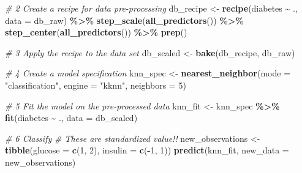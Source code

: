 \documentclass[
]{book}
\newenvironment{Shaded}{\begin{snugshade}}{\end{snugshade}}
\newcommand{\AttributeTok}[1]{\textcolor[rgb]{0.13,0.29,0.53}{#1}}
\newcommand{\CommentTok}[1]{\textcolor[rgb]{0.56,0.35,0.01}{\textit{#1}}}
\newcommand{\DecValTok}[1]{\textcolor[rgb]{0.00,0.00,0.81}{#1}}
\newcommand{\FunctionTok}[1]{\textcolor[rgb]{0.13,0.29,0.53}{\textbf{#1}}}
\newcommand{\NormalTok}[1]{#1}
\newcommand{\OtherTok}[1]{\textcolor[rgb]{0.56,0.35,0.01}{#1}}
\newcommand{\SpecialCharTok}[1]{\textcolor[rgb]{0.81,0.36,0.00}{\textbf{#1}}}
\newcommand{\StringTok}[1]{\textcolor[rgb]{0.31,0.60,0.02}{#1}}
\begin{document}
\begin{Shaded}
\begin{Highlighting}[]
\CommentTok{\# 2 Create a recipe for data pre{-}processing}
\NormalTok{db\_recipe }\OtherTok{\textless{}{-}} \FunctionTok{recipe}\NormalTok{(diabetes }\SpecialCharTok{\textasciitilde{}}\NormalTok{ ., }\AttributeTok{data =}\NormalTok{ db\_raw) }\SpecialCharTok{\%\textgreater{}\%}
  \FunctionTok{step\_scale}\NormalTok{(}\FunctionTok{all\_predictors}\NormalTok{()) }\SpecialCharTok{\%\textgreater{}\%}
  \FunctionTok{step\_center}\NormalTok{(}\FunctionTok{all\_predictors}\NormalTok{()) }\SpecialCharTok{\%\textgreater{}\%}
  \FunctionTok{prep}\NormalTok{()}
\end{Highlighting}
\end{Shaded}

\begin{Shaded}
\begin{Highlighting}[]
\CommentTok{\# 3 Apply the recipe to the data set}
\NormalTok{db\_scaled }\OtherTok{\textless{}{-}}  \FunctionTok{bake}\NormalTok{(db\_recipe, db\_raw)}
\end{Highlighting}
\end{Shaded}

\begin{Shaded}
\begin{Highlighting}[]
\CommentTok{\# 4 Create a model specification}
\NormalTok{knn\_spec }\OtherTok{\textless{}{-}} \FunctionTok{nearest\_neighbor}\NormalTok{(}\AttributeTok{mode =} \StringTok{"classification"}\NormalTok{,}
                             \AttributeTok{engine =} \StringTok{"kknn"}\NormalTok{,}
                             \AttributeTok{neighbors =} \DecValTok{5}\NormalTok{)}
\end{Highlighting}
\end{Shaded}

\begin{Shaded}
\begin{Highlighting}[]
\CommentTok{\# 5 Fit the model on the pre{-}processed data}
\NormalTok{knn\_fit }\OtherTok{\textless{}{-}}\NormalTok{ knn\_spec }\SpecialCharTok{\%\textgreater{}\%}
 \FunctionTok{fit}\NormalTok{(diabetes }\SpecialCharTok{\textasciitilde{}}\NormalTok{ ., }\AttributeTok{data =}\NormalTok{ db\_scaled)}
\end{Highlighting}
\end{Shaded}

\begin{Shaded}
\begin{Highlighting}[]
\CommentTok{\# 6 Classify}
\CommentTok{\# These are standardized value!!}
\NormalTok{new\_observations }\OtherTok{\textless{}{-}} \FunctionTok{tibble}\NormalTok{(}\AttributeTok{glucose =} \FunctionTok{c}\NormalTok{(}\DecValTok{1}\NormalTok{, }\DecValTok{2}\NormalTok{), }\AttributeTok{insulin =} \FunctionTok{c}\NormalTok{(}\SpecialCharTok{{-}}\DecValTok{1}\NormalTok{, }\DecValTok{1}\NormalTok{))}
\FunctionTok{predict}\NormalTok{(knn\_fit, }\AttributeTok{new\_data =}\NormalTok{ new\_observations)}
\end{Highlighting}
\end{Shaded}
\end{document}
